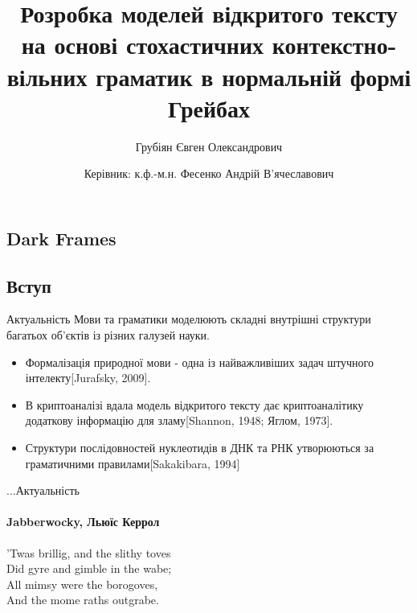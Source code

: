 \documentclass{beamer}
\title{Розробка моделей відкритого тексту на основі стохастичних контекстно-вільних граматик в нормальній формі Грейбах} %
\subtitle{Грубіян Євген Олександрович}
\author{Керівник: к.ф.-м.н. Фесенко Андрій В'ячеславович}
\begin{document}
  \frame{\maketitle}


  \begin{darkframes}
    \section{Dark Frames}
    \subsection{Вступ}
    \begin{frame}{Актуальність}
      Мови та граматики моделюють складні внутрішні структури багатьох об'єктів із різних галузей науки.
      \begin{itemize}
        \item Формалізація природної мови - одна із найважливіших задач штучного інтелекту[Jurafsky, 2009].
        \item В криптоаналізі вдала модель відкритого тексту дає криптоаналітику додаткову інформацію для зламу[Shannon, 1948; Яглом, 1973].
        \item Структури послідовностей нуклеотидів в ДНК та РНК утворюються за граматичними правилами[Sakakibara, 1994]
      \end{itemize}
    \end{frame}

    \begin{frame}{...Актуальність}
      \framesubtitle{Jabberwocky, Льюїс Керрол}%
      'Twas brillig, and the slithy toves\\
      Did gyre and gimble in the wabe;\\
      All mimsy were the borogoves,\\
      And the mome raths outgrabe.\\\bigskip


\end{frame}
\end{darkframes}
\end{document}
